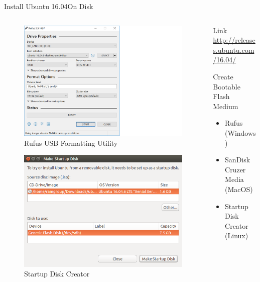 \documentclass{beamer}
\begin{document}
\begin{frame}{Install Ubuntu 16.04}{On Disk}
	\begin{columns}[T]
		\begin{column}{0.5\textwidth}
			\begin{figure}
				\includegraphics[scale=0.17]{../figs/rufus_en_2x.png}
				\caption{Rufus USB Formatting Utility}
			\end{figure}
			\begin{figure}
				\includegraphics[scale=0.15]{../figs/startupDiskCreator.png}
				\caption{Startup Disk Creator}
			\end{figure}
		\end{column}
		\begin{column}{0.5\textwidth}
			\begin{block}{Link}
				\url{http://releases.ubuntu.com/16.04/}
			\end{block}
			\begin{block}{Create Bootable Flash Medium}
			\begin{itemize}
				\item Rufus (Windows)
				\item SanDisk Cruzer Media (MacOS)
				\item Startup Disk Creator (Linux)
			\end{itemize}
			\end{block}
		\end{column}
	\end{columns}	  
\end{frame}
\end{document}
